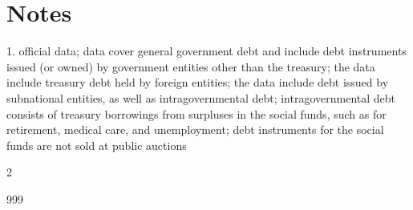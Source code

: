 \documentclass[openany]{book}
\begin{document}
\chapter{Notes}

1. official data; data cover general government debt and include debt instruments issued (or owned) by government entities other than the treasury; the data include treasury debt held by foreign entities; the data include debt issued by subnational entities, as well as intragovernmental debt; intragovernmental debt consists of treasury borrowings from surpluses in the social funds, such as for retirement, medical care, and unemployment; debt instruments for the social funds are not sold at public auctions

\backmatter
\begingroup\sloppy
\begin{multicols}{2}
\begin{thebibliography}{999}\RaggedRight


\end{thebibliography}
\end{multicols}
\end{document}
